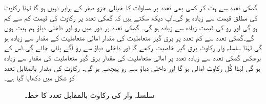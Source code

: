 گمکی تعدد سے ہٹ کر کسی بھی تعدد پر مساوات  کا خیالی جزو صفر کے برابر نہیں ہو گا لہٰذا رکاوٹ کی مطلق قیمت  سے زیادہ ہو گی۔آپ دیکھ سکتے ہیں کہ گمکی تعدد پر رکاوٹ کی قیمت کم سے کم ہو گی اور رو کی قیمت زیادہ سے زیادہ ہو گی۔ گمکی تعدد پر دور میں رو اور داخلی دباؤ ہم ہیت ہوں گے۔گمکی تعدد سے کم تعدد پر برق گیر متعاملیت کی مقدار امالی متعاملیت کے مقدار سے زیادہ ہو گی لہٰذا سلسلہ وار رکاوٹ برق گیر خاصیت رکھے گا اور داخلی دباؤ سے رو آگے پائی جائے گی۔اس کے برعکس گمکی تعدد سے زیادہ تعدد پر امالی متعاملیت کی مقدار برق گیر متعاملیت کی مقدار سے زیادہ ہو گی لہٰذا کُل رکاوٹ امالی ہو گا اور داخلی دباؤ سے رو پیچھے ہو گی۔ رکاوٹ کی مقدار بالمقابل تعدد کو شکل  میں دکھایا گیا ہے۔
\begin{figure}
\centering
{}
\caption{سلسلہ وار  کی رکاوٹ بالمقابل تعدد کا خط۔}
\label{شکل_تعددی_رکاوٹ_بالمقابل_تعدد_سلسلہ_وار_دور}
\end{figure}


